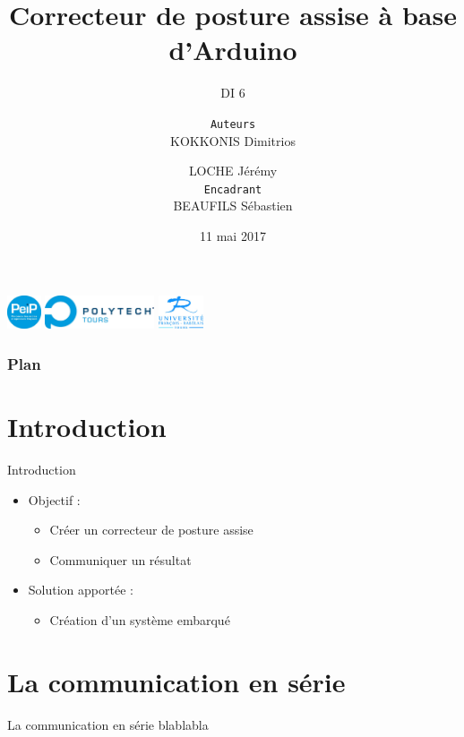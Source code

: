 \documentclass{beamer}
\title{Correcteur de posture assise à base d'Arduino}
\subtitle{\small DI 6}
\author[KOKKONIS Dimitrios \\\and LOCHE Jérémy]{\small {\small \texttt{Auteurs}}\\ KOKKONIS Dimitrios \\\and LOCHE Jérémy\\
\vspace{5px}
{\small \texttt{Encadrant}}\\ BEAUFILS Sébastien}
\institute{\textsc{École Polytechnique de l'Université de Tours}}
\date{11 mai 2017}
\begin{document}
\begin{frame}
\vspace{0.1cm}
\includegraphics[height=1cm]{images/Logo_PeiP_v2009_RGB_3cm_300dpi.jpg}
\includegraphics[height=1cm]{images/logo_Polytech_Tours_RVB_3cm_300dpi.jpg}
\hfill
\includegraphics[height=1cm]{images/logo_UFR_4cm_300dpi.jpg}
\titlepage
\end{frame}

\begin{frame}
\frametitle{Plan}
\tableofcontents
\end{frame}

\section*{Introduction}
\begin{frame}
\begin{block}{Introduction}
\begin{itemize}
\pause
\item Objectif :
\pause
\begin{itemize}
\item Créer un correcteur de posture assise
\pause
\item Communiquer un résultat
\end{itemize}
\pause
\item Solution apportée :
\begin{itemize}
\pause
\item Création d'un système embarqué 
\end{itemize}
\end{itemize}
\end{block}
\end{frame}

\section{La communication en série}
\begin{frame}
\begin{block}{La communication en série}
\pause
blablabla
\end{block}
\end{frame}
\end{document}
